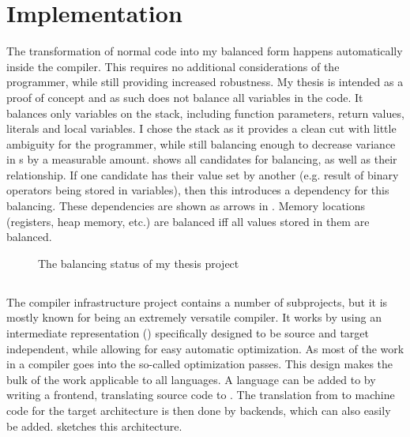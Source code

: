 \section{Implementation}
\label{pass}
The transformation of normal code into my balanced form happens automatically inside the compiler.
This requires no additional considerations of the programmer, while still providing increased robustness.
My thesis is intended as a proof of concept and as such does not balance all variables in the code.
It balances only variables on the stack, including function parameters, return values, literals and local variables.
I chose the stack as it provides a clean cut with little ambiguity for the programmer, while still balancing enough to decrease variance in \hammingw{}s by a measurable amount.
 shows all candidates for balancing, as well as their relationship.
If one candidate has their value set by another (e.g. result of binary operators being stored in variables), then this introduces a dependency for this balancing.
These dependencies are shown as arrows in .
Memory locations (registers, heap memory, etc.) are balanced iff all values stored in them are balanced.

\begin{figure}[h]
  \centering
  \caption{The balancing status of my thesis project}
  \label{fig:implementation}
\end{figure}

\subsection{\llvm{}}
\label{llvm}
The \llvm{} compiler infrastructure project\cite{lattner2010llvm} contains a number of subprojects, but it is mostly known for being an extremely versatile compiler.
It works by using an intermediate representation (\ir{}) specifically designed to be source and target independent, while allowing for easy automatic optimization.
As most of the work in a compiler goes into the so-called optimization passes.
This design makes the bulk of the work applicable to all languages.
A language can be added to \llvm{} by writing a frontend, translating source code to \ir{}.
The translation from \ir{} to machine code for the target architecture is then done by backends, which can also easily be added.
 sketches this architecture.

